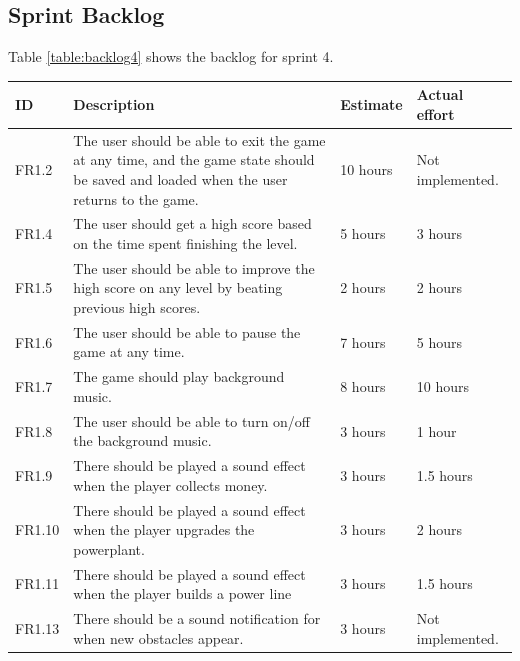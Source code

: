 \clearpage
\subsection{Sprint Backlog}

	Table \ref{table:backlog4} shows the backlog for sprint 4.

	\begin{table} [H]
	\begin{tabular}{| p{1cm} | p{7cm} | p{2cm} | p{2cm} |}
		\hline
		\rowcolor{gray}
		ID & Description & Estimate & Actual effort \\ \hline
		FR1.2 &  The user should be able to exit the game at any time, and the game state should be saved and loaded when the user returns to the game. 
		& 10 hours & Not implemented. \\ \hline

		FR1.4 & The user should get a high score based on the time spent finishing the level. 
		& 5 hours & 3 hours \\ \hline

		FR1.5 & The user should be able to improve the high score on any level by beating previous high scores. 
		& 2 hours & 2 hours  \\ \hline

		FR1.6 & The user should be able to pause the game at any time. 
		& 7 hours & 5 hours \\ \hline

		FR1.7 & The game should play background music. 
		& 8 hours & 10 hours \\ \hline

		FR1.8 & The user should be able to turn on/off the background music. 
		& 3 hours & 1 hour \\ \hline

		FR1.9 & There should be played a sound effect when the player collects money. 
		& 3 hours & 1.5 hours \\ \hline

		FR1.10 & There should be played a sound effect when the player upgrades the powerplant. 
		& 3 hours & 2 hours \\ \hline

		FR1.11 & There should be played a sound effect when the player builds a power line 
		& 3 hours & 1.5 hours \\ \hline

		FR1.13 & There should be a sound notification for when new obstacles appear. 
		& 3 hours & Not implemented. \\ \hline


\end{tabular}
\end{table}
